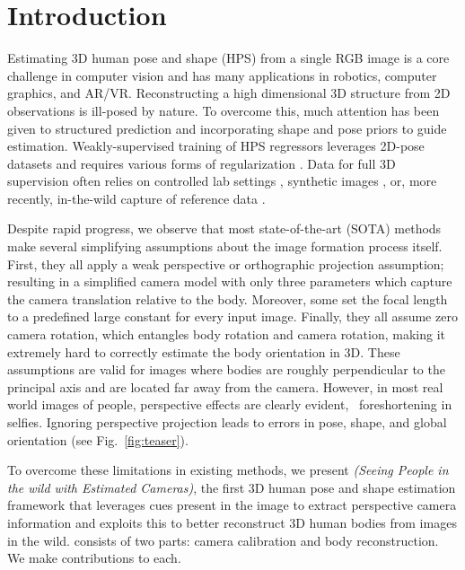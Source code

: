 \documentclass[10pt,twocolumn,letterpaper,usenames,dvipsnames]{article}
\begin{document}
\section{Introduction}
\label{introduction}
Estimating 3D human pose and shape (HPS) from a single RGB image is a core challenge in computer vision and has many  applications in robotics, computer graphics, and AR/VR. 
Reconstructing a high dimensional 3D structure from 2D observations is ill-posed by nature. 
To overcome this, much attention has been given to structured prediction \cite{deepcap,huang2017pami,vlasic2008articulated} and incorporating shape and pose priors \cite{SMPL-X:2019,Xu_2020_CVPR} to guide estimation.
Weakly-supervised training of HPS regressors leverages 2D-pose datasets \cite{mpii,lspet,coco} and requires various forms of regularization \cite{kanazawa_hmr,SPIN:ICCV:2019,xu2019denserac}.
Data for full 3D supervision often relies on 
controlled lab settings \cite{ionescu_h36m,Sigal:IJCV:10b},  synthetic images \cite{varol17_surreal}, or, more recently, in-the-wild capture of reference data \cite{Mehta2018XNectRM,vonMarcard2018_3dpw}.

Despite rapid progress, we observe that most state-of-the-art (SOTA) methods \cite{bogo_smplify,expose2020eccv,guler_2019_CVPR,jiang2020mpshape,joo2020eft,kanazawa_hmr,kanazawa_temporal_hmr,kocabas2019vibe,kolotouros2019cmr,SPIN:ICCV:2019,SMPL-X:2019,Rockwell2020,song2020human,CenterHMR,zanfir2020weakly} make several simplifying assumptions about the image formation process itself.
First, they all apply a weak perspective or orthographic projection assumption; resulting in a simplified camera model with only three parameters which capture the camera translation relative to the body.
Moreover, some \cite{kocabas2019vibe,SPIN:ICCV:2019,SMPL-X:2019} set the focal length to a predefined large constant for every input image.
Finally, they all assume zero camera rotation, which entangles body rotation and camera rotation, making it extremely hard to correctly estimate the body orientation in 3D.
These assumptions are valid for images where bodies are roughly perpendicular to the principal axis and are located far away from the camera. However, in most real world images of people, perspective effects are clearly evident, \eg~foreshortening in selfies. 
Ignoring perspective projection leads to errors in pose, shape, and global orientation (see Fig.~\ref{fig:teaser}). 

To overcome these limitations in existing methods, we present \emph{\methodname (Seeing People in the wild with Estimated Cameras)}, the first 3D human pose and shape estimation framework that leverages cues present in the image to extract perspective camera information and exploits this to better reconstruct 3D human bodies from images in the wild.
\methodname consists of two parts: camera calibration and body reconstruction. We make contributions to each.
\end{document}
